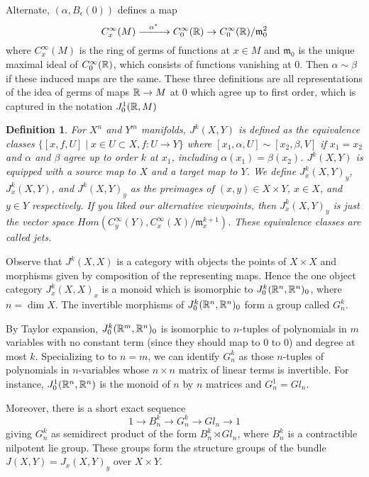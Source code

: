 \documentclass{article}
\newtheorem{definition}[theorem]{Definition}
\newtheorem{proposed work}[theorem]{Proposed Work}
\begin{document}
Alternate, $(\alpha, B_{\epsilon}(0))$ defines a map
\[
  {C^\infty_{  x  }(M)} \xrightarrow{\,\,\,\,\,\,\alpha^*\,\,\,\,\,\,} C^\infty_0(\mathbb R) \to C^\infty_0(\mathbb R)/  {\mathfrak{m}_0^2}
\]
where $C^\infty_x(M)$ is the ring of germs of functions at $x \in M$ and $\mathfrak{m}_0$ is the unique maximal ideal of $C^\infty_0(\mathbb R)$, which consists of functions vanishing at 0. Then $\alpha\sim\beta$ if these induced maps are the same. These three definitions are all representations of the idea of germs of maps $\mathbb R \to M$ at 0 which agree up to first order, which is captured in the notation $J^1_0(\mathbb R, M)$


\begin{definition}
For $X^n$ and $Y^m$ manifolds, $J^k(X,Y)$ is defined as the equivalence classes $\{[x,f, U] \mid x\in U\subset X, f:U\to Y\}$ 
where $[x_1, \alpha, U]\sim [x_2, \beta, V]$ if $x_1=x_2$ and $\alpha$ and $\beta$ agree up to order $k$ at $x_1$, including $\alpha(x_1)=\beta(x_2)$.
$J^k(X,Y)$ is equipped with a source map to $X$ and a target map to $Y$.
We define $J^k_x(X,Y)_y$, $J^k_x(X,Y)$, and $J^k(X,Y)_y$ as the preimages of $(x,y)\in X\times Y$, $x\in X$, and $y\in Y$ respectively.
If you liked our alternative viewpoints, then $J^k_x(X,Y)_y$ is just the vector space $Hom(C^\infty_y(Y), C^\infty_x(X)/\mathfrak{m}_x^{k+1})$.
These equivalence classes are called jets.
\end{definition}

Observe that $J^k(X,X)$ is a category with objects the points of $X\times X$ and morphisms given by composition of the representing maps.  Hence the one object category $J^k_x(X,X)_x$ is a monoid which is isomorphic to $J^k_0(\mathbb R^n,\mathbb R^n)_0$, where $n=\dim X$. The invertible morphisms of $J^k_0(\mathbb R^n, \mathbb R^n)_0$ form a group called $G^k_n$.

By Taylor expansion, $J^k_0(\mathbb R^m, \mathbb R^n)_0$ is isomorphic to $n$-tuples of polynomials in $m$ variables with no constant term (since they should map to 0 to 0) and degree at most $k$. Specializing to to $n=m$, we can identify $G^k_n$ as those $n$-tuples of polynomials in $n$-variables whose $n\times n$ matrix of linear terms is invertible. For instance, $J^1_0(\mathbb R^n,\mathbb R^n)$ is the monoid of $n$ by $n$ matrices and $G^1_n=Gl_n$.


Moreover, there is a short exact sequence
\[
  1\to B_n^k\to G^k_n\to Gl_n\to 1
\]
giving $G^k_n$ as semidirect product of the form $B_n^k \rtimes Gl_n$,  where $B_n^k$ is a contractible nilpotent lie group. These groups form the structure groups of the bundle $J(X,Y)=J_x(X,Y)_y$ over $X\times Y$.
\end{document}
